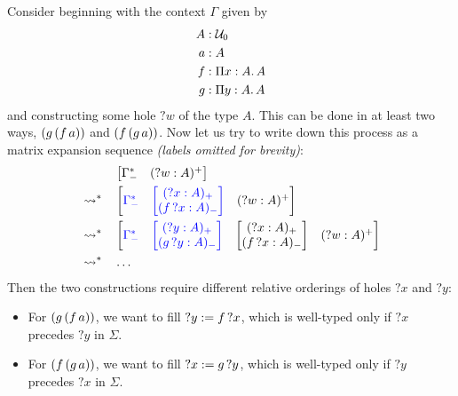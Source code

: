 \documentclass[twoside]{report}
\begin{document}
\begin{example}
    Consider beginning with the context $\Gamma$ given by
    $$
        \begin{aligned}
            A & : \mathcal U_0 \\
            a & : A            \\
            f & : \Pi{x} : {A}.\,{A}   \\
            g & : \Pi{y} : {A}.\,{A}   \\
        \end{aligned}
    $$
    and constructing some hole ${?w}$ of the type $A$. This can be done in at least two ways, $({g}\,{({f}\,{a})})$ and $({f}\,{({g}\,{a})})$. Now let us try to write down this process as a matrix expansion sequence \emph{(labels omitted for brevity)}:
    $$
        \begin{aligned}
             &                       &  & \begin{bmatrix}\Gamma^\ast_- & ({?w} : A)^+\end{bmatrix}                                                                                                                             \\
             & \rightsquigarrow^\ast &  & \begin{bmatrix}\textcolor{blue}{\Gamma^\ast_-} & \textcolor{blue}{\begin{bmatrix}({?x} : A)_+ \\ ({f}\,{?x} : A)_-\end{bmatrix}} & ({?w} : A)^+\end{bmatrix}                                             \\
             & \rightsquigarrow^\ast &  & \begin{bmatrix}\textcolor{blue}{\Gamma^\ast_-} & \textcolor{blue}{\begin{bmatrix}({?y} : A)_+ \\ ({g}\,{?y} : A)_-\end{bmatrix}} & \begin{bmatrix}({?x} : A)_+ \\ ({f}\,{?x} : A)_-\end{bmatrix} & ({?w} : A)^+\end{bmatrix} \\
             & \rightsquigarrow^\ast &  & \ldots                                                                                                                                                         \\
        \end{aligned}
    $$
    Then the two constructions require different relative orderings of holes ${?x}$ and ${?y}$:
    \begin{itemize}[noitemsep]
        \item For $({g}\,{({f}\,{a})})$, we want to fill ${?y} := {f}\,{?x}$, which is well-typed only if ${?x}$ precedes ${?y}$ in $\Sigma$.
        \item For $({f}\,{({g}\,{a})})$, we want to fill ${?x} := {g}\,{?y}$, which is well-typed only if ${?y}$ precedes ${?x}$ in $\Sigma$.
    \end{itemize}
\end{example}
\end{document}
